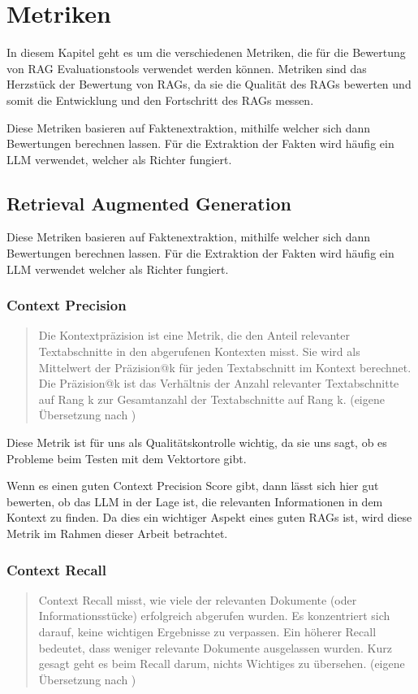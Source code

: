 \chapter{Metriken}

\label{chap:formal}
In diesem Kapitel geht es um die verschiedenen Metriken, die für die Bewertung von RAG Evaluationstools verwendet werden können.
Metriken sind das Herzstück der Bewertung von RAGs, da sie die Qualität des RAGs bewerten und somit die Entwicklung und den Fortschritt des RAGs messen.

Diese Metriken basieren auf Faktenextraktion, mithilfe welcher sich dann Bewertungen berechnen lassen.
Für die Extraktion der Fakten wird häufig ein LLM verwendet, welcher als Richter fungiert.

\section{Retrieval Augmented Generation}
Diese Metriken basieren auf Faktenextraktion, mithilfe welcher sich dann Bewertungen berechnen lassen.
Für die Extraktion der Fakten wird häufig ein LLM verwendet welcher als Richter fungiert.


\subsection{Context Precision}
\begin{quote}
Die Kontextpräzision ist eine Metrik, die den Anteil relevanter Textabschnitte in den abgerufenen Kontexten misst.
Sie wird als Mittelwert der Präzision@k für jeden Textabschnitt im Kontext berechnet.
Die Präzision@k ist das Verhältnis der Anzahl relevanter Textabschnitte auf Rang k zur Gesamtanzahl der Textabschnitte auf Rang k.
(eigene Übersetzung nach \cite{ragas_context_precision})
\end{quote}
Diese Metrik ist für uns als Qualitätskontrolle wichtig, da sie uns sagt, ob es Probleme beim Testen mit dem Vektortore gibt.

Wenn es einen guten Context Precision Score gibt, dann lässt sich hier gut bewerten, ob das LLM in der Lage ist, die relevanten Informationen in dem Kontext zu finden.
Da dies ein wichtiger Aspekt eines guten RAGs ist, wird diese Metrik im Rahmen dieser Arbeit betrachtet.

\subsection{Context Recall}
\begin{quote}
Context Recall misst, wie viele der relevanten Dokumente (oder Informationsstücke) erfolgreich abgerufen wurden.
Es konzentriert sich darauf, keine wichtigen Ergebnisse zu verpassen.
Ein höherer Recall bedeutet, dass weniger relevante Dokumente ausgelassen wurden.
Kurz gesagt geht es beim Recall darum, nichts Wichtiges zu übersehen.
(eigene Übersetzung nach \cite{ragas_context_recall})
\end{quote}

